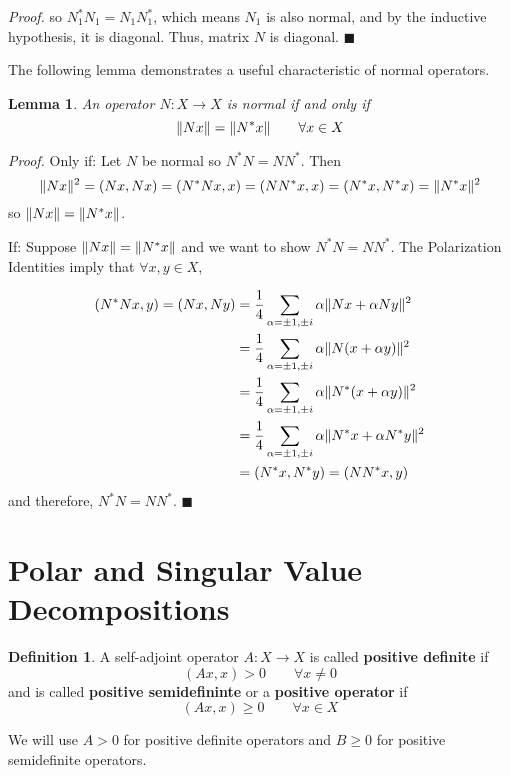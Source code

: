 \documentclass[a4paper,10pt]{book}
\theoremstyle{plain}
\renewenvironment{proof}{\textsl{Proof.}}{\hfill$\blacksquare$}
\theoremstyle{plain}
\newtheorem{lemma}[theorem]{Lemma}
\newenvironment{lproof}{\textsl{Proof.}}{\hfill$\blacksquare$}
\theoremstyle{definition}
\newtheorem{definition}{Definition}[section]
\begin{document}
\begin{proof}
so $N_{1}^{*} N_{1} = N_{1} N_{1}^{*}$, which means $N_{1}$ is also normal, and by the inductive hypothesis, it is diagonal. Thus, matrix $N$ is diagonal. 
\end{proof}

The following lemma demonstrates a useful characteristic of normal operators. 

\begin{lemma}
An operator $N: X \rightarrow X$ is normal if and only if 
$$\lVert Nx\rVert = \lVert N^{*} x\rVert \qquad \forall x \in X$$
\end{lemma}

\begin{lproof}
Only if: Let $N$ be normal so $N^{*}N = NN^{*}$. Then 
$$\lVert Nx\rVert^{2} = (Nx, Nx) = (N^{*}Nx, x) = (NN^{*} x, x) = (N^{*} x, N^{*} x) = \lVert N^{*} x\rVert^{2} $$
so $\lVert Nx\rVert = \lVert N^{*} x\rVert$.

If: Suppose $\lVert Nx\rVert = \lVert N^{*} x\rVert$ and we want to show $N^{*}N = NN^{*}$. The Polarization Identities imply that $ \forall x, y \in X$, 

$$
\begin{aligned} 
(N^{*}N x, y) = (Nx, Ny) &= \frac{1}{4} \sum_{\alpha = \pm 1, \pm i} \alpha \lVert Nx + \alpha Ny\rVert^{2} \\
&= \frac{1}{4} \sum_{\alpha = \pm 1, \pm i} \alpha \lVert N( x + \alpha y)\rVert^{2} \\
&= \frac{1}{4} \sum_{\alpha = \pm 1, \pm i} \alpha \lVert N^{*} ( x + \alpha y)\rVert^{2} \\
&= \frac{1}{4} \sum_{\alpha = \pm 1, \pm i} \alpha \lVert N^{*} x + \alpha N^{*} y\rVert^{2} \\
&= (N^{*} x, N^{*} y) = (NN^{*} x, y)
\end{aligned} 
$$
and therefore, $N^{*}N = NN^{*}$. 
\end{lproof}

\section{Polar and Singular Value Decompositions}

\begin{definition}
A self-adjoint operator $A: X \rightarrow X$ is called \textbf{positive definite} if 
$$(Ax, x) > 0 \qquad \forall x \neq 0$$
and is called \textbf{positive semidefininte} or a \textbf{positive operator} if 
$$(Ax, x) \geq 0 \qquad \forall x \in X$$

We will use $A > 0$ for positive definite operators and $B \geq 0$ for positive semidefinite operators. 
\end{definition}
\end{document}
